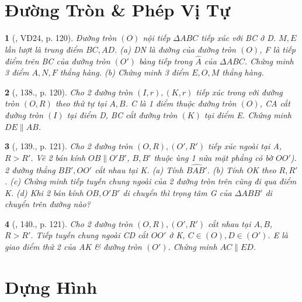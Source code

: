 \documentclass{article}
\newtheorem{baitoan}{}
\begin{document}

\section{Đường Tròn \& Phép Vị Tự}

\begin{baitoan}[\cite{Binh_Toan_9_tap_1}, VD24, p. 120]
	Đường tròn $(O)$ nội tiếp $\Delta ABC$ tiếp xúc với BC ở D. $M,E$ lần lượt là trung điểm $BC,AD$. (a) DN là đường của đường tròn $(O)$, F là tiếp điểm trên BC của đường tròn $(O')$ bàng tiếp trong $\widehat{A}$ của $\Delta ABC$. Chứng minh 3 điểm $A,N,F$ thẳng hàng. (b) Chứng minh 3 điểm $E,O,M$ thẳng hàng.
\end{baitoan}

\begin{baitoan}[\cite{Binh_Toan_9_tap_1}, 138., p. 120]
	Cho 2 đường tròn $(I,r),(K,r)$ tiếp xúc trong với đường tròn $(O,R)$ theo thứ tự tại $A,B$. C là 1 điểm thuộc đường tròn $(O)$, CA cắt đường tròn $(I)$ tại điểm D, BC cắt đường tròn $(K)$ tại điểm E. Chứng minh $DE\parallel AB$.
\end{baitoan}

\begin{baitoan}[\cite{Binh_Toan_9_tap_1}, 139., p. 121]
	Cho 2 đường tròn $(O,R),(O',R')$ tiếp xúc ngoài tại A, $R > R'$. Vẽ 2 bán kính $OB\parallel O'B'$, $B,B'$ thuộc ùng 1 nửa mặt phẳng có bờ $OO'$). 2 đường thẳng $BB',OO'$ cắt nhau tại K. (a) Tính $\widehat{BAB'}$. (b) Tính OK theo $R,R'$. (c) Chứng minh tiếp tuyến chung ngoài của 2 đường tròn trên cũng đi qua điểm K. (d) Khi 2 bán kính $OB,O'B'$ di chuyển thì trọng tâm G của $\Delta ABB'$ di chuyển trên đường nào?
\end{baitoan}

\begin{baitoan}[\cite{Binh_Toan_9_tap_1}, 140., p. 121]
	Cho 2 đường tròn $(O,R),(O',R')$ cắt nhau tại $A,B$, $R > R'$. Tiếp tuyến chung ngoài CD cắt $OO'$ ở K, $C\in(O),D\in(O')$. E là giao điểm thứ 2 của AK \& đường tròn $(O')$. Chứng minh $AC\parallel ED$.
\end{baitoan}


\section{Dựng Hình}
\end{document}
